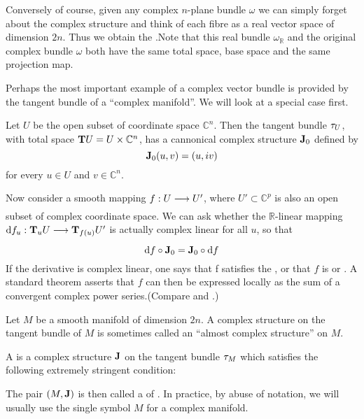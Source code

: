 \documentclass[../main]{subfiles}
\begin{document}
Conversely of course, given any complex $n$-plane bundle $\omega$ we can simply forget about the complex structure and think of each fibre as a real vector space of dimension $2n$. Thus we obtain the .Note that this real bundle $\omega_\mathbb{R}$ and the original complex bundle $\omega$ both have the same total space, base space and the same projection map.

Perhaps the most important example of a complex vector bundle is provided by the tangent bundle of a ``complex manifold''. We will look at a special case first.

\renewcommand{\theexample}{\thechapter.\arabic{example}}
\setcounter{example}{1}
\begin{example}\label{ex:13.2}
Let $U$ be the open subset of coordinate space $\mathbb{C}^n$. Then the tangent bundle $\tau_{U}$, with total space $\mathbf{T}U=U\times \mathbb{C}^n$, has a cannonical complex structure $\mathbf{J}_0$ defined by 
\[\mathbf{J}_0(u,v)= (u,iv)\]
for every $u\in U$ and $v\in \mathbb{C}^n$.

Now consider a smooth mapping $f:U\varrightarrow{} U'$, where $U'\subset \mathbb{C}^p$ is also an open subset of complex coordinate space. We can ask whether the $\mathbb{R}$-linear mapping $\differential{f}{u}:\tangentspace{U}{u}\varrightarrow{}\tangentspace{U'}{f(u)}$ is actually complex linear for all $u$, so that
\[\mathrm{d} f\circ\mathbf{J}_0=\mathbf{J}_0\circ \mathrm{d} f\]
If the derivative is complex linear, one says that f satisfies the , or that $f$ is  or . A standard theorem asserts that $f$ can then be expressed locally as the sum of a convergent complex power series.(Compare \cite{hormander1973introduction} and \cite{gunning2009analytic}.)
\end{example}
\renewcommand{\theexample}{\arabic{example}}

Let $M$ be a smooth manifold of dimension $2n$. A complex structure on the tangent bundle of $M$ is sometimes called an ``almost complex structure'' on $M$.
\begin{customdef}{13.3}\label{def:13.3}
A  is a complex structure $\mathbf{J}$ on the tangent bundle $\tau_{M}$ which satisfies the following extremely stringent condition: 

The pair $(M,\mathbf{J})$ is then called a  of . In practice, by abuse of notation, we will usually use the single symbol $M$ for a complex manifold.
\end{customdef}
\end{document}
